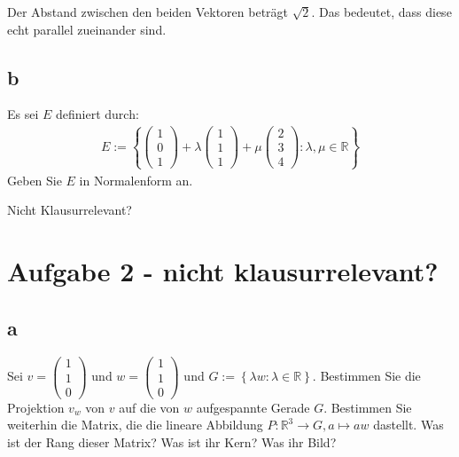 Der Abstand zwischen den beiden Vektoren beträgt $\sqrt{2}$. Das bedeutet, dass diese echt parallel zueinander sind.

\subsection{b}

Es sei $E$ definiert durch:
\begin{align*}
    E := \left\{\begin{pmatrix}
    1 \\ 0 \\1
    \end{pmatrix} + \lambda \begin{pmatrix}
        1 \\ 1 \\ 1
    \end{pmatrix} + \mu \begin{pmatrix}
        2 \\ 3 \\ 4
    \end{pmatrix}: \lambda, \mu \in \mathbb{R}\right\}
\end{align*}
Geben Sie $E$ in Normalenform an.

Nicht Klausurrelevant?

\section{Aufgabe 2 - nicht klausurrelevant?}

\subsection{a}
Sei $v = \begin{pmatrix}
    1 \\ 1 \\ 0
\end{pmatrix}$ und $w = \begin{pmatrix}
    1 \\ 1 \\ 0
\end{pmatrix}$ und $G := \left\{\lambda w: \lambda \in \mathbb{R}\right\}$. Bestimmen Sie die Projektion $v_w$ von 
$v$ auf die von $w$ aufgespannte Gerade $G$.
Bestimmen Sie weiterhin die Matrix, die die lineare Abbildung $P: \mathbb{R}^3 \rightarrow G, a \mapsto aw$ dastellt. 
Was ist der Rang dieser Matrix? Was ist ihr Kern? Was ihr Bild?


